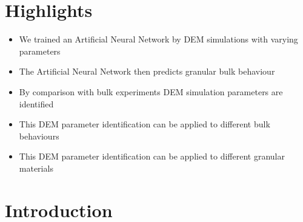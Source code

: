 \documentclass[review]{elsarticle}
\begin{document}

\section{Highlights}
\label{sec:highlights}
\begin{itemize}
  \item{We trained an Artificial Neural Network by DEM simulations with varying
  parameters}
  \item{The Artificial Neural Network then predicts granular bulk behaviour}
  \item{By comparison with bulk experiments DEM simulation parameters are
  identified}
  \item{This DEM parameter identification can be applied to different bulk
  behaviours}
  \item{This DEM parameter identification can be applied to different granular
  materials}
\end{itemize}

\section{Introduction}
\label{sec:introduction}
\end{document}
